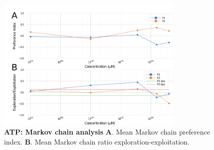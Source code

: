\begin{appendices}
\begin{figure}[h]
      \includegraphics[width=0.8\textwidth]{part_2/assets/atp_markov.png}
      \caption{\textbf{ATP: Markov chain analysis} \textbf{A}. Mean Markov chain preference index. \textbf{B}. Mean Markov chain ratio exploration-exploitation.}
      \label{atp_markov}
    \end{figure}


\end{appendices}
